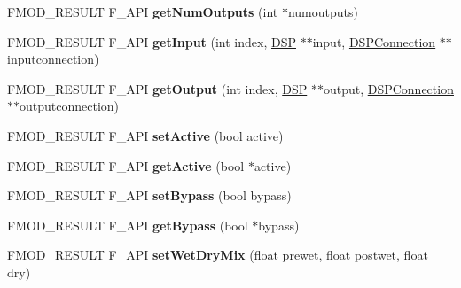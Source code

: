 \begin{DoxyCompactItemize}
\item 
\mbox{\label{classFMOD_1_1DSP_a26bcf3c3560fae9e15db4ea1a39d21e3}} 
F\+M\+O\+D\+\_\+\+R\+E\+S\+U\+LT F\+\_\+\+A\+PI {\bfseries get\+Num\+Outputs} (int $\ast$numoutputs)
\item 
\mbox{\label{classFMOD_1_1DSP_adebf041723376a94c176edf0126c8321}} 
F\+M\+O\+D\+\_\+\+R\+E\+S\+U\+LT F\+\_\+\+A\+PI {\bfseries get\+Input} (int index, \hyperlink{classFMOD_1_1DSP}{D\+SP} $\ast$$\ast$input, \hyperlink{classFMOD_1_1DSPConnection}{D\+S\+P\+Connection} $\ast$$\ast$inputconnection)
\item 
\mbox{\label{classFMOD_1_1DSP_a13584fc2ef78192b375ca6d117a49560}} 
F\+M\+O\+D\+\_\+\+R\+E\+S\+U\+LT F\+\_\+\+A\+PI {\bfseries get\+Output} (int index, \hyperlink{classFMOD_1_1DSP}{D\+SP} $\ast$$\ast$output, \hyperlink{classFMOD_1_1DSPConnection}{D\+S\+P\+Connection} $\ast$$\ast$outputconnection)
\item 
\mbox{\label{classFMOD_1_1DSP_ab85ee53bebfd6fc3cccb9979cf13eaba}} 
F\+M\+O\+D\+\_\+\+R\+E\+S\+U\+LT F\+\_\+\+A\+PI {\bfseries set\+Active} (bool active)
\item 
\mbox{\label{classFMOD_1_1DSP_ac802a3beb3dfb2dca8cd2717926a3413}} 
F\+M\+O\+D\+\_\+\+R\+E\+S\+U\+LT F\+\_\+\+A\+PI {\bfseries get\+Active} (bool $\ast$active)
\item 
\mbox{\label{classFMOD_1_1DSP_ac0e9c1d934542b45a8ec39f488de559a}} 
F\+M\+O\+D\+\_\+\+R\+E\+S\+U\+LT F\+\_\+\+A\+PI {\bfseries set\+Bypass} (bool bypass)
\item 
\mbox{\label{classFMOD_1_1DSP_a019b1b2e5b980dc4d4b70c1c86fe4240}} 
F\+M\+O\+D\+\_\+\+R\+E\+S\+U\+LT F\+\_\+\+A\+PI {\bfseries get\+Bypass} (bool $\ast$bypass)
\item 
\mbox{\label{classFMOD_1_1DSP_a1070de2d840d88b7fee21aab37016053}} 
F\+M\+O\+D\+\_\+\+R\+E\+S\+U\+LT F\+\_\+\+A\+PI {\bfseries set\+Wet\+Dry\+Mix} (float prewet, float postwet, float dry)
\item 
\mbox{\label{classFMOD_1_1DSP_a7e0ef3f97f823000de321c7f69c633b0}} 

\end{DoxyCompactItemize}
